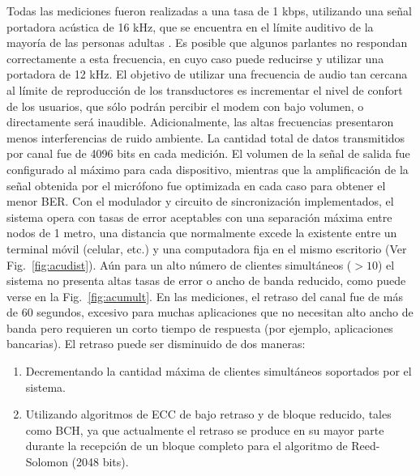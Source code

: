 Todas las mediciones fueron realizadas a una tasa de 1 kbps, utilizando una señal portadora acústica de 16 kHz, que se encuentra en el límite auditivo de la mayoría de las personas adultas \cite{gordon2005hearing}. Es posible que algunos parlantes no respondan correctamente a esta frecuencia, en cuyo caso puede reducirse y utilizar una portadora de 12 kHz. El objetivo de utilizar una frecuencia de audio tan cercana al límite de reproducción de los transductores es incrementar el nivel de confort de los usuarios, que sólo podrán percibir el modem con bajo volumen, o directamente será inaudible. Adicionalmente, las altas frecuencias presentaron menos interferencias de ruido ambiente.
La cantidad total de datos transmitidos por canal fue de 4096 bits en cada medición. El volumen de la señal de salida fue configurado al máximo para cada dispositivo, mientras que la amplificación de la señal obtenida por el micrófono fue optimizada en cada caso para obtener el menor BER.
Con el modulador y circuito de sincronización implementados, el sistema opera con tasas de error aceptables con una separación máxima entre nodos de 1 metro, una distancia que normalmente excede la existente entre un terminal móvil (celular, etc.) y una computadora fija en el mismo escritorio (Ver Fig.~\ref{fig:acudist}). Aún para un alto número de clientes simultáneos ($> 10$) el sistema no presenta altas tasas de error o ancho de banda reducido, como puede verse en la Fig.~\ref{fig:acumult}.
En las mediciones, el retraso del canal fue de más de 60 segundos, excesivo para muchas aplicaciones que no necesitan alto ancho de banda pero requieren un corto tiempo de respuesta (por ejemplo, aplicaciones bancarias). El retraso puede ser disminuido de dos maneras: 
\begin{enumerate}
 \item Decrementando la cantidad máxima de clientes simultáneos soportados por el sistema.
 \item Utilizando algoritmos de ECC de bajo retraso y de bloque reducido, tales como BCH, ya que actualmente el retraso se produce en su mayor parte durante la recepción de un bloque completo para el algoritmo de Reed-Solomon (2048 bits).
\end{enumerate}



